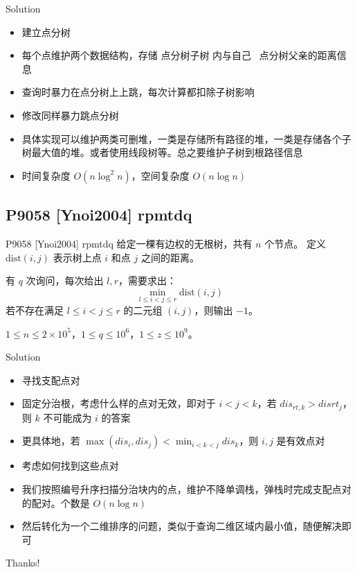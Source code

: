 ﻿\documentclass[aspectratio=169]{ctexbeamer}
\begin{document}
\begin{frame}{Solution}
    \begin{itemize}
        \item 建立点分树
        \item 每个点维护两个数据结构，存储 点分树子树 内与自己 \ 点分树父亲的距离信息
        \item 查询时暴力在点分树上上跳，每次计算都扣除子树影响
        \item 修改同样暴力跳点分树
        \item 具体实现可以维护两类可删堆，一类是存储所有路径的堆，一类是存储各个子树最大值的堆。或者使用线段树等。总之要维护子树到根路径信息
        \item 时间复杂度 $O(n\log^2n)$，空间复杂度 $O(n\log n)$
    \end{itemize}
\end{frame}

\subsection{P9058 [Ynoi2004] rpmtdq}
\begin{frame}[fragile]{P9058 [Ynoi2004] rpmtdq}
    给定一棵有边权的无根树，共有 \(n\) 个节点。
    定义 \(\mathrm{dist}(i,j)\) 表示树上点 \(i\) 和点 \(j\) 之间的距离。

    有 \(q\) 次询问，每次给出 \(l,r\)，需要求出：
    \[
    \min_{l\le i<j\le r} \mathrm{dist}(i,j)
    \]
    若不存在满足 \(l\le i<j\le r\) 的二元组 \((i,j)\)，则输出 \(-1\)。

    \medskip
    \(1\le n\le 2\times 10^5\)，\(1\le q\le 10^6\)，\(1\le z\le 10^9\)。
\end{frame}

\begin{frame}{Solution}
    \begin{itemize}
        \item 寻找支配点对
        \item 固定分治根，考虑什么样的点对无效，即对于 $i<j<k$，若 $dis_{rt,k}>dis{rt_j}$，则 $k$ 不可能成为 $i$ 的答案
        \item 更具体地，若 $\max(dis_i,dis_j)<\min_{i<k<j}dis_k$，则 $i,j$ 是有效点对
        \item 考虑如何找到这些点对
        \item 我们按照编号升序扫描分治块内的点，维护不降单调栈，弹栈时完成支配点对的配对。个数是 $O(n\log n)$
        \item 然后转化为一个二维排序的问题，类似于查询二维区域内最小值，随便解决即可
    \end{itemize}
\end{frame}


\begin{frame}
    \begin{center}
        {\Huge\calligra Thanks!}
    \end{center}
\end{frame}
\end{document}
